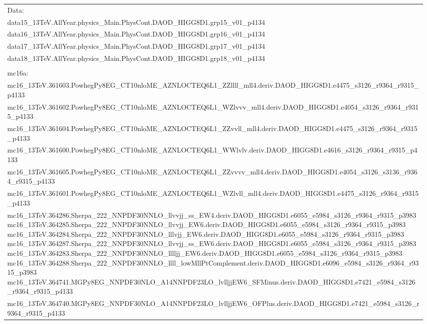 \begin{adjustwidth}{-3em}{-3em}
\begin{longtable}{l}
Data: \\
data15\_13TeV.AllYear.physics\_Main.PhysCont.DAOD\_HIGG8D1.grp15\_v01\_p4134 \\
data16\_13TeV.AllYear.physics\_Main.PhysCont.DAOD\_HIGG8D1.grp16\_v01\_p4134 \\
data17\_13TeV.AllYear.physics\_Main.PhysCont.DAOD\_HIGG8D1.grp17\_v01\_p4134 \\
data18\_13TeV.AllYear.physics\_Main.PhysCont.DAOD\_HIGG8D1.grp18\_v01\_p4134 \\
 \\
mc16a: \\
mc16\_13TeV.361603.PowhegPy8EG\_CT10nloME\_AZNLOCTEQ6L1\_ZZllll\_mll4.deriv.DAOD\_HIGG8D1.e4475\_s3126\_r9364\_r9315\_p4133 \\
mc16\_13TeV.361602.PowhegPy8EG\_CT10nloME\_AZNLOCTEQ6L1\_WZlvvv\_mll4.deriv.DAOD\_HIGG8D1.e4054\_s3126\_r9364\_r9315\_p4133 \\
mc16\_13TeV.361604.PowhegPy8EG\_CT10nloME\_AZNLOCTEQ6L1\_ZZvvll\_mll4.deriv.DAOD\_HIGG8D1.e4475\_s3126\_r9364\_r9315\_p4133 \\
mc16\_13TeV.361600.PowhegPy8EG\_CT10nloME\_AZNLOCTEQ6L1\_WWlvlv.deriv.DAOD\_HIGG8D1.e4616\_s3126\_r9364\_r9315\_p4133 \\
mc16\_13TeV.361605.PowhegPy8EG\_CT10nloME\_AZNLOCTEQ6L1\_ZZvvvv\_mll4.deriv.DAOD\_HIGG8D1.e4054\_s3126\_s3136\_r9364\_r9315\_p4133 \\
mc16\_13TeV.361601.PowhegPy8EG\_CT10nloME\_AZNLOCTEQ6L1\_WZlvll\_mll4.deriv.DAOD\_HIGG8D1.e4475\_s3126\_r9364\_r9315\_p4133 \\
mc16\_13TeV.364286.Sherpa\_222\_NNPDF30NNLO\_llvvjj\_ss\_EW4.deriv.DAOD\_HIGG8D1.e6055\_e5984\_s3126\_r9364\_r9315\_p3983
mc16\_13TeV.364285.Sherpa\_222\_NNPDF30NNLO\_llvvjj\_EW6.deriv.DAOD\_HIGG8D1.e6055\_e5984\_s3126\_r9364\_r9315\_p3983
mc16\_13TeV.364284.Sherpa\_222\_NNPDF30NNLO\_lllvjj\_EW6.deriv.DAOD\_HIGG8D1.e6055\_e5984\_s3126\_r9364\_r9315\_p3983
mc16\_13TeV.364287.Sherpa\_222\_NNPDF30NNLO\_llvvjj\_ss\_EW6.deriv.DAOD\_HIGG8D1.e6055\_e5984\_s3126\_r9364\_r9315\_p3983
mc16\_13TeV.364283.Sherpa\_222\_NNPDF30NNLO\_lllljj\_EW6.deriv.DAOD\_HIGG8D1.e6055\_e5984\_s3126\_r9364\_r9315\_p3983
mc16\_13TeV.364288.Sherpa\_222\_NNPDF30NNLO\_llll\_lowMllPtComplement.deriv.DAOD\_HIGG8D1.e6096\_e5984\_s3126\_r9364\_r9315\_p3983
mc16\_13TeV.364741.MGPy8EG\_NNPDF30NLO\_A14NNPDF23LO\_lvlljjEW6\_SFMinus.deriv.DAOD\_HIGG8D1.e7421\_e5984\_s3126\_r9364\_r9315\_p4133 \\
mc16\_13TeV.364740.MGPy8EG\_NNPDF30NLO\_A14NNPDF23LO\_lvlljjEW6\_OFPlus.deriv.DAOD\_HIGG8D1.e7421\_e5984\_s3126\_r9364\_r9315\_p4133 \\

\end{longtable}
\end{adjustwidth}
